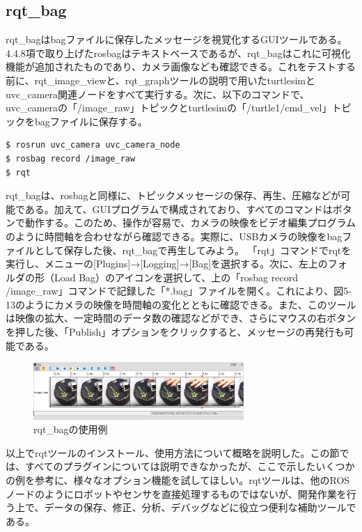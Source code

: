 \subsection{rqt\_bag}

rqt\_bagはbagファイルに保存したメッセージを視覚化するGUIツールである。4.4.8項で取り上げたrosbagはテキストベースであるが、rqt\_bagはこれに可視化機能が追加されたものであり、カメラ画像なども確認できる。これをテストする前に、rqt\_image\_viewと、rqt\_graphツールの説明で用いたturtlesimとuvc\_camera関連ノードをすべて実行する。次に、以下のコマンドで、uvc\_cameraの「/image\_raw」トピックとturtlesimの「/turtle1/cmd\_vel」トピックをbagファイルに保存する。

\begin{lstlisting}[language=ROS]
$ rosrun uvc_camera uvc_camera_node
$ rosbag record /image_raw
$ rqt
\end{lstlisting}

rqt\_bagは、rosbagと同様に、トピックメッセージの保存、再生、圧縮などが可能である。加えて、GUIプログラムで構成されており、すべてのコマンドはボタンで動作する。このため、操作が容易で、カメラの映像をビデオ編集プログラムのように時間軸を合わせながら確認できる。実際に、USBカメラの映像をbagファイルとして保存した後、rqt\_bagで再生してみよう。
「rqt」コマンドでrqtを実行し、メニューの[Plugins]→[Logging]→[Bag]を選択する。次に、左上のフォルダの形（Load Bag）のアイコンを選択して、上の「rosbag record /image\_raw」コマンドで記録した「*.bag」ファイルを開く。これにより、図5-13のようにカメラの映像を時間軸の変化とともに確認できる。また、このツールは映像の拡大、一定時間のデータ数の確認などができ、さらにマウスの右ボタンを押した後、「Publish」オプションをクリックすると、メッセージの再発行も可能である。

\begin{figure}[h]
  \centering
  \includegraphics[width=8cm]{pictures/chapter5/pic_05_13.png}
  \caption{rqt\_bagの使用例}
\end{figure}

以上でrqtツールのインストール、使用方法について概略を説明した。この節では、すべてのプラグインについては説明できなかったが、ここで示したいくつかの例を参考に、様々なオプション機能を試してほしい。rqtツールは、他のROSノードのようにロボットやセンサを直接処理するものではないが、開発作業を行う上で、データの保存、修正、分析、デバッグなどに役立つ便利な補助ツールである。

